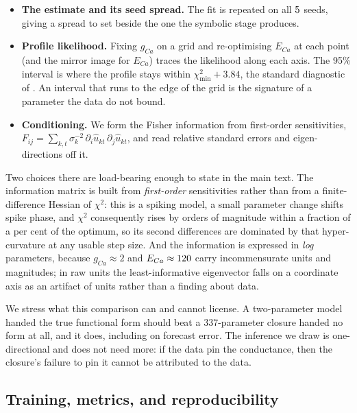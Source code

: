 \documentclass{article}
\newcommand{\NparamUde}{337}   %
\begin{document}
\begin{itemize}
  \item \textbf{The estimate and its seed spread.} The fit is repeated on all
  $5$ seeds, giving a spread to set beside the one the
  symbolic stage produces.
  \item \textbf{Profile likelihood.} Fixing $g_{Ca}$ on a grid and re-optimising
  $E_{Ca}$ at each point (and the mirror image for $E_{Ca}$) traces the
  likelihood along each axis. The 95\% interval is where the profile stays %
  within $\chi^2_{\min}+3.84$, the standard diagnostic of %
  \citet{raue2009}. An interval that runs to the edge of the grid is the
  signature of a parameter the data do not bound.
  \item \textbf{Conditioning.} We form the Fisher information from first-order
  sensitivities, $F_{ij} = \sum_{k,t}\sigma_k^{-2}\,\partial_i \hat u_{kt}\,
  \partial_j \hat u_{kt}$, and read relative standard errors and eigen-directions
  off it.
\end{itemize}

Two choices there are load-bearing enough to state in the main text. The
information matrix is built from \emph{first-order} sensitivities rather than
from a finite-difference Hessian of $\chi^2$: this is a spiking model, a small
parameter change shifts spike phase, and $\chi^2$ consequently rises by orders of
magnitude within a fraction of a per cent of the optimum, so its second
differences are dominated by that hyper-curvature at any usable step size. And
the information is expressed in \emph{log} parameters, because $g_{Ca}\approx 2$
and $E_{Ca}\approx120$ carry incommensurate units and magnitudes; in raw units
the least-informative eigenvector falls on a coordinate axis as an artifact of
units rather than a finding about data.

We stress what this comparison can and cannot license. A two-parameter model
handed the true functional form should beat a $\NparamUde$-parameter closure
handed no form at all, and it does, including on forecast error. The inference we
draw is one-directional and does not need more: if the data pin the conductance,
then the closure's failure to pin it cannot be attributed to the data.

\subsection{Training, metrics, and reproducibility}
\label{sec:methods-train}
\end{document}
